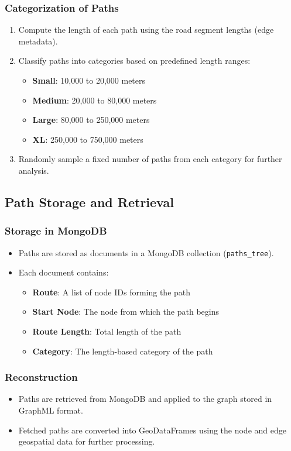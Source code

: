 \documentclass[a4paper,UKenglish,cleveref, autoref, thm-restate]{lipics-v2021}
\begin{document}
\subsubsection{Categorization of Paths}
\begin{enumerate}
    \item Compute the length of each path using the road segment lengths (edge metadata).
    \item Classify paths into categories based on predefined length ranges:
    \begin{itemize}
        \item \textbf{Small}: 10,000 to 20,000 meters
        \item \textbf{Medium}: 20,000 to 80,000 meters
        \item \textbf{Large}: 80,000 to 250,000 meters
        \item \textbf{XL}: 250,000 to 750,000 meters
    \end{itemize}
    \item Randomly sample a fixed number of paths from each category for further analysis.
\end{enumerate}

\subsection{Path Storage and Retrieval}
\subsubsection{Storage in MongoDB}
\begin{itemize}
    \item Paths are stored as documents in a MongoDB collection (\texttt{paths\_tree}).
    \item Each document contains:
    \begin{itemize}
        \item \textbf{Route}: A list of node IDs forming the path
        \item \textbf{Start Node}: The node from which the path begins
        \item \textbf{Route Length}: Total length of the path
        \item \textbf{Category}: The length-based category of the path
    \end{itemize}
\end{itemize}

\subsubsection{Reconstruction}
\begin{itemize}
    \item Paths are retrieved from MongoDB and applied to the graph stored in GraphML format.
    \item Fetched paths are converted into GeoDataFrames using the node and edge geospatial data for further processing.
\end{itemize}
\end{document}

